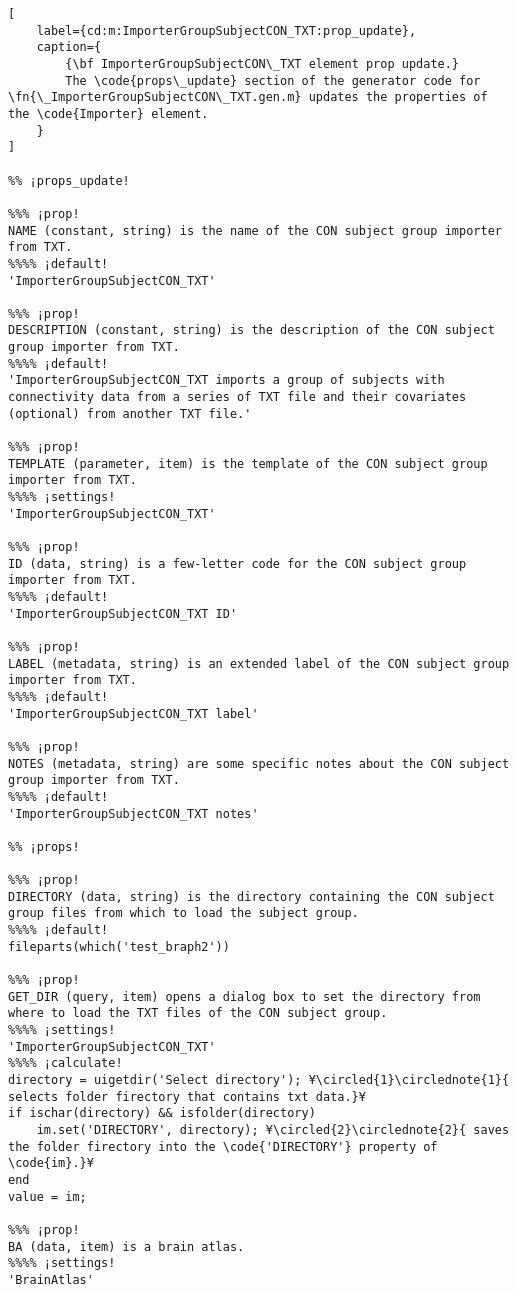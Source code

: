 \documentclass{tufte-handout}
\begin{document}
\begin{lstlisting}[
	label={cd:m:ImporterGroupSubjectCON_TXT:prop_update},
	caption={
		{\bf ImporterGroupSubjectCON\_TXT element prop update.}
		The \code{props\_update} section of the generator code for \fn{\_ImporterGroupSubjectCON\_TXT.gen.m} updates the properties of the \code{Importer} element.
	}
]

%% ¡props_update!

%%% ¡prop!
NAME (constant, string) is the name of the CON subject group importer from TXT.
%%%% ¡default!
'ImporterGroupSubjectCON_TXT'

%%% ¡prop!
DESCRIPTION (constant, string) is the description of the CON subject group importer from TXT.
%%%% ¡default!
'ImporterGroupSubjectCON_TXT imports a group of subjects with connectivity data from a series of TXT file and their covariates (optional) from another TXT file.'

%%% ¡prop!
TEMPLATE (parameter, item) is the template of the CON subject group importer from TXT.
%%%% ¡settings!
'ImporterGroupSubjectCON_TXT'

%%% ¡prop!
ID (data, string) is a few-letter code for the CON subject group importer from TXT.
%%%% ¡default!
'ImporterGroupSubjectCON_TXT ID'

%%% ¡prop!
LABEL (metadata, string) is an extended label of the CON subject group importer from TXT.
%%%% ¡default!
'ImporterGroupSubjectCON_TXT label'

%%% ¡prop!
NOTES (metadata, string) are some specific notes about the CON subject group importer from TXT.
%%%% ¡default!
'ImporterGroupSubjectCON_TXT notes'

%% ¡props!

%%% ¡prop!
DIRECTORY (data, string) is the directory containing the CON subject group files from which to load the subject group. 
%%%% ¡default!
fileparts(which('test_braph2'))

%%% ¡prop!
GET_DIR (query, item) opens a dialog box to set the directory from where to load the TXT files of the CON subject group.
%%%% ¡settings!
'ImporterGroupSubjectCON_TXT'
%%%% ¡calculate!
directory = uigetdir('Select directory'); ¥\circled{1}\circlednote{1}{ selects folder firectory that contains txt data.}¥
if ischar(directory) && isfolder(directory)
	im.set('DIRECTORY', directory); ¥\circled{2}\circlednote{2}{ saves the folder firectory into the \code{'DIRECTORY'} property of \code{im}.}¥
end
value = im;

%%% ¡prop!
BA (data, item) is a brain atlas.
%%%% ¡settings!
'BrainAtlas'


\end{lstlisting}
\end{document}
